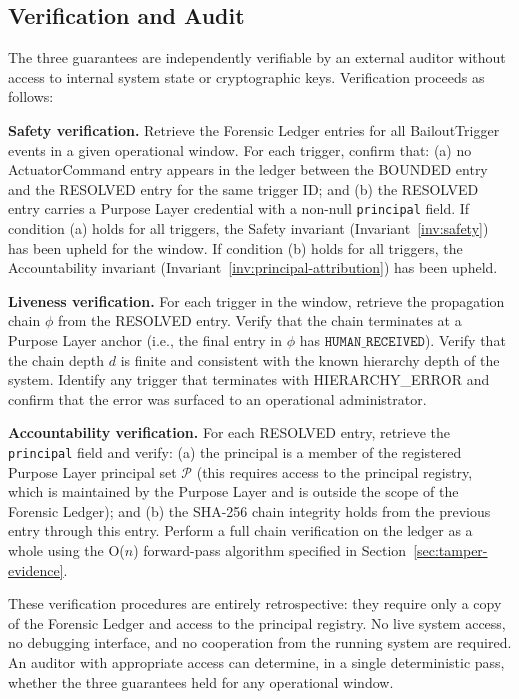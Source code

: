 \subsection{Verification and Audit}
\label{sec:guarantee-verification}

The three guarantees are independently verifiable by an external auditor without access to internal system state or cryptographic keys. Verification proceeds as follows:

\medskip

\noindent\textbf{Safety verification.} Retrieve the Forensic Ledger entries for all BailoutTrigger events in a given operational window. For each trigger, confirm that: (a) no ActuatorCommand entry appears in the ledger between the BOUNDED entry and the RESOLVED entry for the same trigger ID; and (b) the RESOLVED entry carries a Purpose Layer credential with a non-null \texttt{principal} field. If condition (a) holds for all triggers, the Safety invariant (Invariant~\ref{inv:safety}) has been upheld for the window. If condition (b) holds for all triggers, the Accountability invariant (Invariant~\ref{inv:principal-attribution}) has been upheld.

\medskip

\noindent\textbf{Liveness verification.} For each trigger in the window, retrieve the propagation chain $\phi$ from the RESOLVED entry. Verify that the chain terminates at a Purpose Layer anchor (i.e., the final entry in $\phi$ has $\texttt{HUMAN\_RECEIVED}$). Verify that the chain depth $d$ is finite and consistent with the known hierarchy depth of the system. Identify any trigger that terminates with HIERARCHY\_ERROR and confirm that the error was surfaced to an operational administrator.

\medskip

\noindent\textbf{Accountability verification.} For each RESOLVED entry, retrieve the \texttt{principal} field and verify: (a) the principal is a member of the registered Purpose Layer principal set $\mathcal{P}$ (this requires access to the principal registry, which is maintained by the Purpose Layer and is outside the scope of the Forensic Ledger); and (b) the SHA-256 chain integrity holds from the previous entry through this entry. Perform a full chain verification on the ledger as a whole using the O($n$) forward-pass algorithm specified in Section~\ref{sec:tamper-evidence}.

These verification procedures are entirely retrospective: they require only a copy of the Forensic Ledger and access to the principal registry. No live system access, no debugging interface, and no cooperation from the running system are required. An auditor with appropriate access can determine, in a single deterministic pass, whether the three guarantees held for any operational window.

